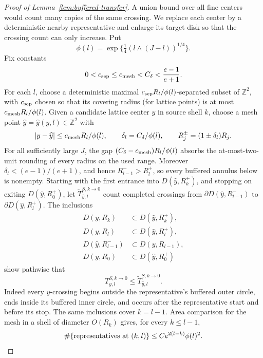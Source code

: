 \begin{proof}[Proof of Lemma~\ref{lem:buffered-transfer}]
A union bound over all fine centers would count many copies of the same
crossing.  We replace each center by a deterministic nearby representative
and enlarge its target disk so that the crossing count can only increase.  Put
\[
\phi(l)=\exp\{\tfrac14(l\wedge(J-l))^{1/4}\}.
\]
Fix constants
\[
0<c_{\rm sep}\le c_{\rm mesh}<C_\delta<\frac{e-1}{e+1}.
\]
For each $l$, choose a deterministic maximal
$c_{\rm sep}R_l/\phi(l)$-separated subset of $\mathbb Z^2$, with
$c_{\rm sep}$ chosen so that its covering radius (for lattice points) is
at most $c_{\rm mesh}R_l/\phi(l)$.  Given a candidate lattice center
$y$ in source shell $k$, choose a mesh point
$\widehat y=\widehat y(y,l)\in\mathbb Z^2$ with
\[
|y-\widehat y|\le c_{\rm mesh}R_l/\phi(l),\qquad
 \delta_l=C_\delta/\phi(l),\qquad R_j^\pm=(1\pm\delta_l)R_j.
\]
For all sufficiently large $J$, the gap
$(C_\delta-c_{\rm mesh})R_l/\phi(l)$ absorbs the at-most-two-unit
rounding of every radius on the used range.  Moreover
$\delta_l<(e-1)/(e+1)$, and hence
$R_{l-1}^->R_l^+$, so every buffered annulus below is nonempty.
Starting with the first entrance into
$D(\widehat y,R_k^+)$, and stopping on exiting
$D(\widehat y,R_0^+)$, let
$\widetilde T_{\widehat y,l}^{S,k\to0}$ count completed crossings from
$\partial D(\widehat y,R_{l-1}^-)$ to
$\partial D(\widehat y,R_l^+)$.  The inclusions
\begin{equation}
\begin{split}
 D(y,R_k)&\subset D(\widehat y,R_k^+),\\
 D(y,R_l)&\subset D(\widehat y,R_l^+),\\
 D(\widehat y,R_{l-1}^-)&\subset D(y,R_{l-1}),\\
 D(y,R_0)&\subset D(\widehat y,R_0^+)
\end{split}\label{eq:ct-transfer-45d0}
\end{equation}
show pathwise that
\begin{equation}
T_{y,l}^{S,k\to0}
       \le\widetilde T_{\widehat y,l}^{S,k\to0}.\label{eq:ct-transfer-45d1}
\end{equation}
Indeed every $y$-crossing begins outside the representative's buffered
outer circle, ends inside its buffered inner circle, and occurs after the
representative start and before its stop.  The same inclusions cover
$k=l-1$.  Area comparison for the mesh in a shell of diameter
$O(R_k)$ gives, for every $k\le l-1$,
\begin{equation}
\#\{\hbox{representatives at }(k,l)\}
 \le C e^{2(l-k)}\phi(l)^2.\label{eq:ct-transfer-45d}
\end{equation}

\end{proof}
